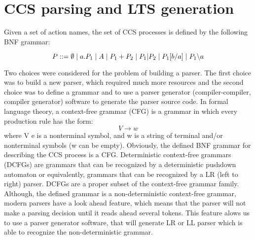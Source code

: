\section{CCS parsing and LTS generation}
\label{sec:parsing}

Given a set of action names, the set of CCS processes is defined by the following BNF grammar:

\begin{equation}\label{eq:ccs_bnf}
P ::= \emptyset \hspace{1 mm} | \hspace{1 mm} a.P_{1} \hspace{1 mm} | \hspace{1 mm} A \hspace{1 mm} | \hspace{1 mm}P_{1}+P_{2} \hspace{1 mm} |
\hspace{1 mm} P_{1} | P_{2} \hspace{1 mm} | \hspace{1 mm} P_{1}[b/a] \hspace{1 mm} | \hspace{1 mm} P_{1} \backslash a
\end{equation}

Two choices were considered for the problem of building a parser. The first choice was to build
a new parser, which required much more resources and the second choice was to define a grammar
and to use a parser generator (compiler-compiler, compiler generator) software to generate the parser source code.
In formal language theory, a context-free grammar (CFG) is a grammar in which every production 
rule has the form:
\[V \rightarrow w \]
where V e is a nonterminal symbol, and w is a string of terminal and/or nonterminal symbols 
(w can be empty). Obviously, the defined BNF grammar for describing the CCS process is a CFG. 
Deterministic context-free grammars (DCFGs) are grammars that can be recognized by a 
deterministic pushdown automaton or equivalently, grammars that can be recognized by a LR (left to right) parser. 
DCFGs are a proper subset of the context-free grammar family. Although, the defined grammar is 
a non-deterministic context-free grammar, modern parsers have a look ahead feature, which means that
the parser will not make a parsing decision until it reads ahead several tokens. This feature
alows us to use a parser generator software, that will generate LR or LL parser which is able to
recognize the non-deterministic grammar.

